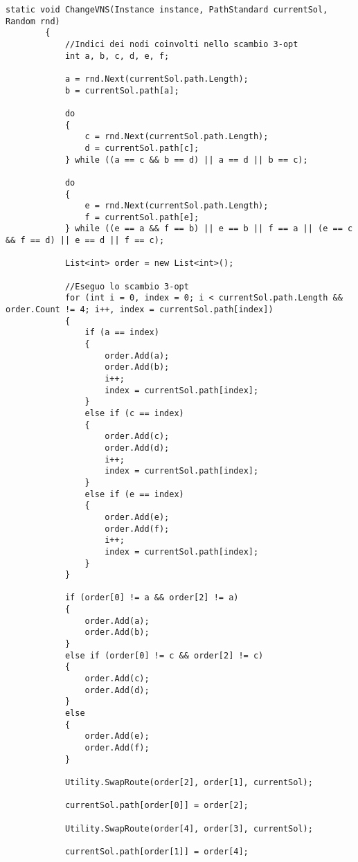 \begin{lstlisting}
static void ChangeVNS(Instance instance, PathStandard currentSol, Random rnd)
        {
        	//Indici dei nodi coinvolti nello scambio 3-opt
            int a, b, c, d, e, f;

            a = rnd.Next(currentSol.path.Length);
            b = currentSol.path[a];

            do
            {
                c = rnd.Next(currentSol.path.Length);
                d = currentSol.path[c];
            } while ((a == c && b == d) || a == d || b == c);

            do
            {
                e = rnd.Next(currentSol.path.Length);
                f = currentSol.path[e];
            } while ((e == a && f == b) || e == b || f == a || (e == c && f == d) || e == d || f == c);

            List<int> order = new List<int>();
			
			//Eseguo lo scambio 3-opt
            for (int i = 0, index = 0; i < currentSol.path.Length && order.Count != 4; i++, index = currentSol.path[index])
            {
                if (a == index)
                {
                    order.Add(a);
                    order.Add(b);
                    i++;
                    index = currentSol.path[index];
                }
                else if (c == index)
                {
                    order.Add(c);
                    order.Add(d);
                    i++;
                    index = currentSol.path[index];
                }
                else if (e == index)
                {
                    order.Add(e);
                    order.Add(f);
                    i++;
                    index = currentSol.path[index];
                }
            }

            if (order[0] != a && order[2] != a)
            {
                order.Add(a);
                order.Add(b);
            }
            else if (order[0] != c && order[2] != c)
            {
                order.Add(c);
                order.Add(d);
            }
            else
            {
                order.Add(e);
                order.Add(f);
            }

            Utility.SwapRoute(order[2], order[1], currentSol);

            currentSol.path[order[0]] = order[2];

            Utility.SwapRoute(order[4], order[3], currentSol);

            currentSol.path[order[1]] = order[4];


\end{lstlisting}

